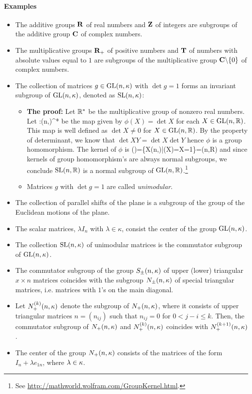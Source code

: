 \paragraph{Examples}
\begin{itemize}
	\item The additive groups $\mathbf{R}$ of real numbers and $\mathbf{Z}$ of integers are subgroups of the additive group $\mathbf{C}$ of complex numbers.
	\item The multiplicative groups $\mathbf{R}_+$ of positive numbers and $\mathbf{T}$ of numbers with absolute values equal to $1$ are subgroups of the multiplicative group $\mathbf{C}\backslash\{0\}$ of complex numbers.
	\item The collection of matrices $g\in \mathrm{GL}(n,\kappa)$ with $\det g=1$ forms an invariant subgroup of $\mathrm{GL}(n,\kappa)$, denoted as $\mathrm{SL}(n,\kappa)$:
	\begin{itemize}
		\item \textbf{The proof:} Let $\mathbb{R}^*$ be the multiplicative group of nonzero real numbers. Let 
		\be 
		\phi:\GL(n,\R)\rightarrow\R^*
		\ee
		be the map given by $\phi(X)=\det X$ for each $X\in\mathrm{GL}(n,\mathbb{R})$. This map is well defined as $\det X\ne 0$ for $X\in\mathrm{GL}(n,\mathbb{R})$. By the property of determinant, we know that \mbox{$\det XY=\det X \det Y$} hence $\phi$ is a group homomorphism. The kernel of $\phi$ is 
		\be 
		\ker(\phi)=\{X\in\GL(n,\R)|\phi(X)=\det X=1\}=\SL(n,R)
		\ee 
		and since kernels of group homomorphism's are always normal subgroups, we conclude $\mathrm{SL}(n,\mathbb{R})$ is a normal subgroup of $\mathrm{GL}(n,\mathbb{R})$.\footnote{See \url{http://mathworld.wolfram.com/GroupKernel.html}.}
		\item Matrices $g$ with $\det g=1$ are called \emph{unimodular}.
	\end{itemize}
	\item The collection of parallel shifts of the plane is a subgroup of the group of the Euclidean motions of the plane.
	\item The scalar matrices, $\lambda I_n$ with $\lambda \in \kappa$, consist the center of the group $\mathrm{GL}(n,\kappa)$.
	\item The collection $\mathrm{SL}(n,\kappa)$ of unimodular matrices is the commutator subgroup of $\mathrm{GL}(n,\kappa)$.
	\item The commutator subgroup of the group $S_\pm(n,\kappa)$ of upper (lower) triangular $x\times n$ matrices coincides with the subgroup $N_\pm(n,\kappa)$ of special triangular matrices, i.e. matrices with $1$'s on the main diagonal. 
	\item Let $N_+^{(k)}(n,\kappa)$ denote the subgroup of $N_+(n,\kappa)$, where it consists of upper triangular matrices $n=(n_{ij})$ such that $n_{ij}=0$ for $0<j-i\le k$. Then, the commutator subgroup of $N_+(n,\kappa)$ and $N_+^{(k)}(n,\kappa)$ coincides with $N_+^{(k+1)}(n,\kappa)$.
	\item The center of the group $N_+(n,\kappa)$ consists of the matrices of the form $I_n+\lambda e_{1n}$, where $\lambda \in \kappa$.
\end{itemize}

